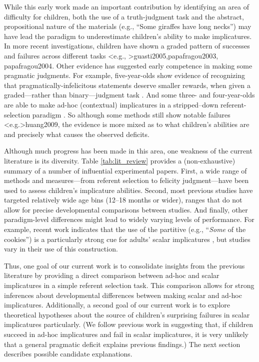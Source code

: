 \documentclass[man]{apa2}
\begin{document}
While this early work made an important contribution by identifying an area of difficulty for children, both the use of a truth-judgment task and the abstract, propositional nature of the materials (e.g., ``Some giraffes have long necks'') may have lead the paradigm to underestimate children's ability to make implicatures. In more recent investigations, children have shown a graded pattern of successes and failures across different tasks \citeA<e.g., >{guasti2005,papafragou2003, papafragou2004}. Other evidence has suggested early competence in making some pragmatic judgments. For example, five-year-olds show evidence of recognizing that pragmatically-infelicitous statements deserve smaller rewards, when given a graded---rather than binary---judgment task . And some three- and four-year-olds are able to make ad-hoc (contextual) implicatures in a stripped--down referent-selection paradigm . So although some methods still show notable failures \citeA<e.g.>{huang2009}, the evidence is more mixed as to what children's abilities are and precisely what causes the observed deficits.

Although much progress has been made in this area, one weakness of the current literature is its diversity. Table \ref{tab:lit_review} provides a (non-exhaustive) summary of a number of influential experimental papers. First, a wide range of methods and measures---from referent selection to felicity judgment---have been used to assess children's implicature abilities. Second, most previous studies have targeted relatively wide age bins (12--18 months or wider), ranges that do not allow for precise developmental comparisons between studies. And finally, other paradigm-level differences might lead to widely varying levels of performance. For example, recent work indicates that the use of the partitive (e.g., ``\emph{Some} of the cookies'') is a particularly strong cue for adults' scalar implicatures , but studies vary in their use of this construction.

Thus, one goal of our current work is to consolidate insights from the previous literature by providing a direct comparison between ad-hoc and scalar implicatures in a simple referent selection task. This comparison allows for strong inferences about developmental differences between making scalar and ad-hoc implicatures. Additionally, a second goal of our current work is to explore theoretical hypotheses about the source of children's surprising failures in scalar implicatures particularly. (We follow previous work in suggesting that, if children succeed in ad-hoc implicatures and fail in scalar implicatures, it is very unlikely that a general pragmatic deficit explains previous findings.) The next section describes possible candidate explanations.
\end{document}
